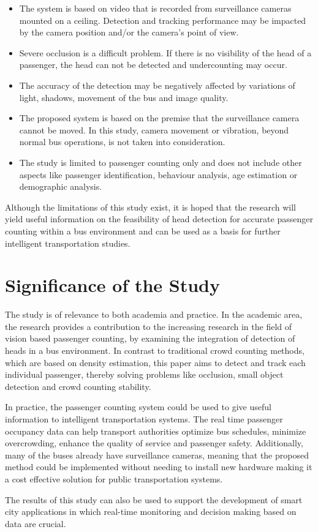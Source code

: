 \begin{itemize}[itemsep=0pt]

    \item  The system is based on video that is recorded from surveillance cameras mounted on a ceiling. Detection and tracking performance may be impacted by the camera position and/or the camera's point of view.

    \item Severe occlusion is a difficult problem. If there is no visibility of the head of a passenger, the head can not be detected and undercounting may occur.

    \item The accuracy of the detection may be negatively affected by variations of light, shadows, movement of the bus and image quality.

    \item The proposed system is based on the premise that the surveillance camera cannot be moved. In this study, camera movement or vibration, beyond normal bus operations, is not taken into consideration.

    \item The study is limited to passenger counting only and does not include other aspects like passenger identification, behaviour analysis, age estimation or demographic analysis.

\end{itemize}

Although the limitations of this study exist, it is hoped that the research will yield useful information on the feasibility of head detection for accurate passenger counting within a bus environment and can be used as a basis for further intelligent transportation studies.

\section{Significance of the Study}

The study is of relevance to both academia and practice. In the academic area, the research provides a contribution to the increasing research in the field of vision based passenger counting, by examining the integration of detection of heads in a bus environment. In contrast to traditional crowd counting methods, which are based on density estimation, this paper aims to detect and track each individual passenger, thereby solving problems like occlusion, small object detection and crowd counting stability.

In practice, the passenger counting system could be used to give useful information to intelligent transportation systems. The real time passenger occupancy data can help transport authorities optimize bus schedules, minimize overcrowding, enhance the quality of service and passenger safety. Additionally, many of the buses already have surveillance cameras, meaning that the proposed method could be implemented without needing to install new hardware making it a cost effective solution for public transportation systems.

The results of this study can also be used to support the development of smart city applications in which real-time monitoring and decision making based on data are crucial.